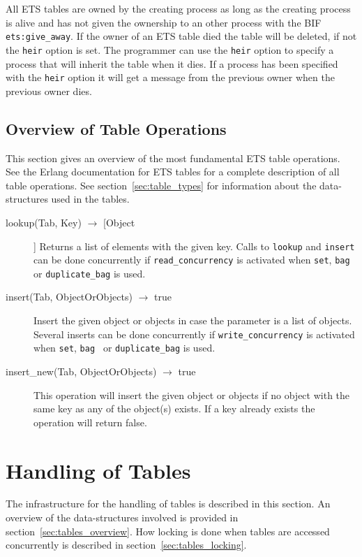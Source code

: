 \documentclass[aps,pre,preprint,nofootinbib]{revtex4}
\begin{document}
All ETS tables are owned by the creating process as long as the creating process is alive and has not given the ownership to an other process with the BIF \verb|ets:give_away|.
If the owner of an ETS table died the table will be deleted, if not the \verb|heir| option is set.
The programmer can use the \verb|heir| option to specify a process that will inherit the table when it dies. 
If a process has been specified with the \verb|heir| option it will get a message from the previous owner when the previous owner dies.

\subsection{Overview of Table Operations}

This section gives an overview of the most fundamental ETS table operations. 
See the Erlang documentation for ETS tables for a complete description of all table operations. 
See section~\ref{sec:table_types} for information about the data-structures used in the tables.

\begin{description}
 \item[lookup(Tab, Key) $\rightarrow$ [Object]] 
 Returns a list of elements with the given key. 
 Calls to \verb|lookup| and \verb|insert| can be done concurrently if \verb|read_concurrency| is activated when \verb|set|, \verb|bag | or \verb|duplicate_bag| is used.
 \item[insert(Tab, ObjectOrObjects) $\rightarrow$ true]
 Insert the given object or objects in case the parameter is a list of objects.
 Several inserts can be done concurrently if \verb|write_concurrency| is activated when \verb|set|, \verb|bag | or \verb|duplicate_bag| is used.
 \item[insert\_new(Tab, ObjectOrObjects) $\rightarrow$ true]
 This operation will insert the given object or objects if no object with the same key as any of the object(s) exists. 
 If a key already exists the operation will return false.
\end{description}


\section{Handling of Tables}

The infrastructure for the handling of tables is described in this section. 
An overview of the data-structures involved is provided in section~\ref{sec:tables_overview}.
How locking is done when tables are accessed concurrently is described in section~\ref{sec:tables_locking}.
\end{document}
